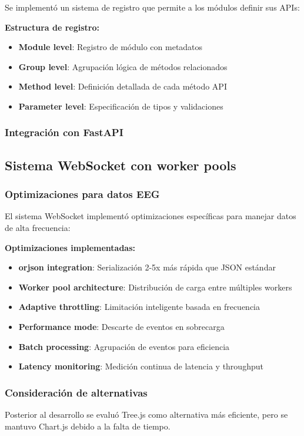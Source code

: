 Se implementó un sistema de registro que permite a los módulos definir sus APIs:

\textbf{Estructura de registro:}
\begin{itemize}
    \item \textbf{Module level}: Registro de módulo con metadatos
    \item \textbf{Group level}: Agrupación lógica de métodos relacionados
    \item \textbf{Method level}: Definición detallada de cada método API
    \item \textbf{Parameter level}: Especificación de tipos y validaciones
\end{itemize}

\subsubsection{Integración con FastAPI}

\subsection{Sistema WebSocket con worker pools}
\label{subsec:websocket_worker_pools}

\subsubsection{Optimizaciones para datos EEG}

El sistema WebSocket implementó optimizaciones específicas para manejar datos de alta frecuencia:

\textbf{Optimizaciones implementadas:}
\begin{itemize}
    \item \textbf{orjson integration}: Serialización 2-5x más rápida que JSON estándar
    \item \textbf{Worker pool architecture}: Distribución de carga entre múltiples workers
    \item \textbf{Adaptive throttling}: Limitación inteligente basada en frecuencia
    \item \textbf{Performance mode}: Descarte de eventos en sobrecarga
    \item \textbf{Batch processing}: Agrupación de eventos para eficiencia
    \item \textbf{Latency monitoring}: Medición continua de latencia y throughput
\end{itemize}

\subsubsection{Consideración de alternativas}

Posterior al desarrollo se evaluó Tree.js como alternativa más eficiente, pero se mantuvo Chart.js debido a la falta de tiempo.
